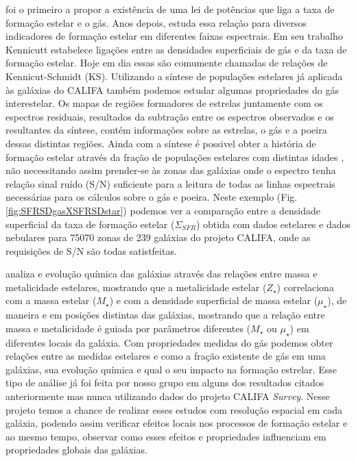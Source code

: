 \documentclass[a4paper,12pt]{article}
\begin{document}
\citet{Schmidt.1959a} foi o primeiro a propor a existência de uma lei de potências que liga a taxa
de formação estelar e o gás. Anos depois, \citet{Kennicutt.1998a} estuda essa relação para diversos
indicadores de formação estelar em diferentes faixas espectrais. Em seu trabalho Kennicutt
estabelece ligações entre as densidades superficiais de gás e da taxa de formação estelar. Hoje em
dia essas são comumente chamadas de relações de Kennicut-Schmidt (KS). Utilizando a síntese de
populações estelares já aplicada às galáxias do CALIFA também podemos estudar algumas propriedades
do gás interestelar. Os mapas de regiões formadores de estrelas juntamente com os espectros
residuais, resultados da subtração entre os espectros observados e os resultantes da síntese, contém
informações sobre as estrelas, o gás e a poeira dessas distintas regiões. Ainda com a síntese é
possivel obter a história de formação estelar através da fração de populações estelares com
distintas idades \citep{Asari.etal.2007a}, não necessitando assim prender-se às zonas das galáxias
onde o espectro tenha relação sinal ruído (S/N) suficiente para a leitura de todas as linhas
espectrais necessárias para os cálculos sobre o gás e poeira. Neste exemplo (Fig.
\ref{fig:SFRSDgasXSFRSDstar}) podemos ver a comparação entre a densidade superficial da taxa de
formação estelar ($\Sigma_{SFR}$) obtida com dados estelares e dados nebulares para 75070 zonas de
239 galáxias do projeto CALIFA, onde as requisições de S/N são todas satistfeitas.

\citet{GonzalezDelgado.etal.2014b} analiza e evolução química das galáxias através das relações
entre massa e metalicidade estelares, mostrando que a metalicidade estelar ($Z_\star$) correlaciona
com a massa estelar ($M_\star$) e com a densidade superficial de massa estelar ($\mu_\star$), de
maneira e em posições distintas das galáxias, mostrando que a relação entre massa e metalicidade é
guiada por parâmetros diferentes ($M_\star$ ou $\mu_\star$) em diferentes locais da galáxia. Com
propriedades medidas do gás podemos obter relações entre as medidas estelares e  como a fração
existente de gás em uma galáxias, sua evolução química e qual o seu impacto na formação estrelar.
Esse tipo de análise já foi feita por nosso grupo em alguns dos resultados citados anteriormente mas
nunca utilizando dados do projeto CALIFA {\em Survey}. Nesse projeto temos a chance de realizar
esses estudos com resolução espacial em cada galáxia, podendo assim verificar efeitos locais nos
processos de formação estelar e ao mesmo tempo, observar como esses efeitos e propriedades
influenciam em propriedades globais das galáxias.
\end{document}
